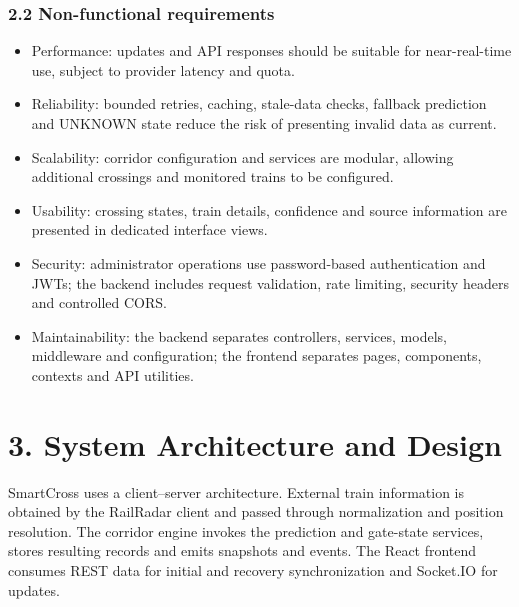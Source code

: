 \documentclass[12pt,a4paper]{report}
\begin{document}
\subsection{2.2 Non-functional requirements}
\begin{itemize}\item Performance: updates and API responses should be suitable for near-real-time use, subject to provider latency and quota.\end{itemize}
\begin{itemize}\item Reliability: bounded retries, caching, stale-data checks, fallback prediction and UNKNOWN state reduce the risk of presenting invalid data as current.\end{itemize}
\begin{itemize}\item Scalability: corridor configuration and services are modular, allowing additional crossings and monitored trains to be configured.\end{itemize}
\begin{itemize}\item Usability: crossing states, train details, confidence and source information are presented in dedicated interface views.\end{itemize}
\begin{itemize}\item Security: administrator operations use password-based authentication and JWTs; the backend includes request validation, rate limiting, security headers and controlled CORS.\end{itemize}
\begin{itemize}\item Maintainability: the backend separates controllers, services, models, middleware and configuration; the frontend separates pages, components, contexts and API utilities.\end{itemize}
\chapter{3. System Architecture and Design}
SmartCross uses a client--server architecture. External train information is obtained by the RailRadar client and passed through normalization and position resolution. The corridor engine invokes the prediction and gate-state services, stores resulting records and emits snapshots and events. The React frontend consumes REST data for initial and recovery synchronization and Socket.IO for updates.
\end{document}
